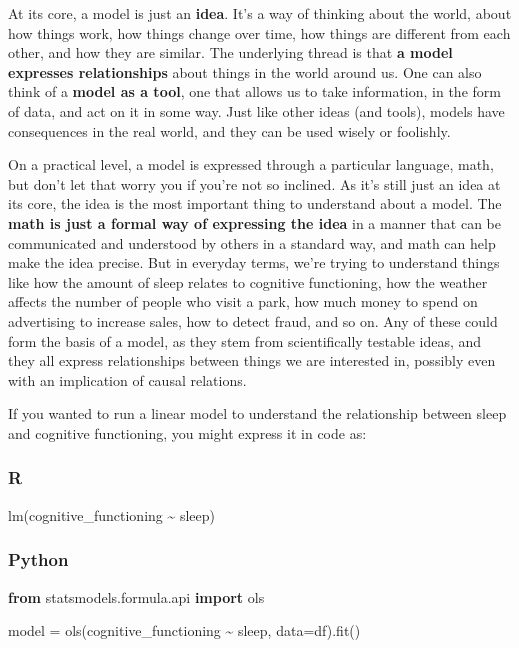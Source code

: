 \documentclass[
  letterpaper,
]{krantz}
\newenvironment{Shaded}{}{}
\newcommand{\FunctionTok}[1]{\textcolor[rgb]{0.02,0.16,0.49}{#1}}
\newcommand{\ImportTok}[1]{\textcolor[rgb]{0.00,0.50,0.00}{\textbf{#1}}}
\newcommand{\NormalTok}[1]{#1}
\newcommand{\OperatorTok}[1]{\textcolor[rgb]{0.40,0.40,0.40}{#1}}
\newcommand{\SpecialCharTok}[1]{\textcolor[rgb]{0.25,0.44,0.63}{#1}}
\newcommand{\StringTok}[1]{\textcolor[rgb]{0.25,0.44,0.63}{#1}}
\begin{document}
At its core, a model is just an \textbf{idea}. It's a way of thinking
about the world, about how things work, how things change over time, how
things are different from each other, and how they are similar. The
underlying thread is that \textbf{a model expresses relationships} about
things in the world around us. One can also think of a \textbf{model as
a tool}, one that allows us to take information, in the form of data,
and act on it in some way. Just like other ideas (and tools), models
have consequences in the real world, and they can be used wisely or
foolishly.

On a practical level, a model is expressed through a particular
language, math, but don't let that worry you if you're not so inclined.
As it's still just an idea at its core, the idea is the most important
thing to understand about a model. The \textbf{math is just a formal way
of expressing the idea} in a manner that can be communicated and
understood by others in a standard way, and math can help make the idea
precise. But in everyday terms, we're trying to understand things like
how the amount of sleep relates to cognitive functioning, how the
weather affects the number of people who visit a park, how much money to
spend on advertising to increase sales, how to detect fraud, and so on.
Any of these could form the basis of a model, as they stem from
scientifically testable ideas, and they all express relationships
between things we are interested in, possibly even with an implication
of causal relations.

If you wanted to run a linear model to understand the relationship
between sleep and cognitive functioning, you might express it in code
as:

\subsubsection{R}

\begin{Shaded}
\begin{Highlighting}[]
\FunctionTok{lm}\NormalTok{(cognitive\_functioning }\SpecialCharTok{\textasciitilde{}}\NormalTok{ sleep)}
\end{Highlighting}
\end{Shaded}

\subsubsection{Python}

\begin{Shaded}
\begin{Highlighting}[]
\ImportTok{from}\NormalTok{ statsmodels.formula.api }\ImportTok{import}\NormalTok{ ols}

\NormalTok{model }\OperatorTok{=}\NormalTok{ ols(}\StringTok{\textquotesingle{}cognitive\_functioning \textasciitilde{} sleep\textquotesingle{}}\NormalTok{, data}\OperatorTok{=}\NormalTok{df).fit()}
\end{Highlighting}
\end{Shaded}
\end{document}
